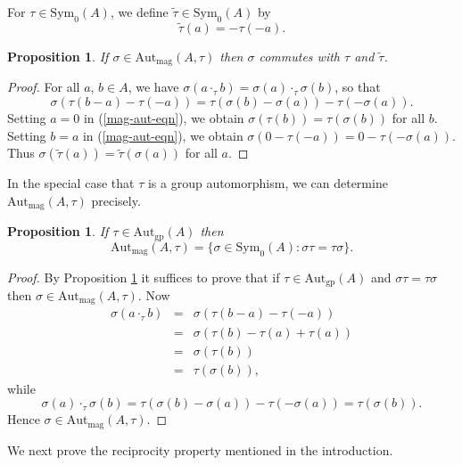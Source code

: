 \documentclass[letterpaper,12pt]{amsart}
\numberwithin{equation}{section}
\numberwithin{algorithm}{section}
\newtheorem{proposition}[lemma]{Proposition}
\theoremstyle{definition}
\newcommand{\Autgp}{\mathrm{Aut}_{\mathrm{gp}}}
\newcommand{\Autmag}{\mathrm{Aut}_\mathrm{mag}}
\newcommand{\Symo}{\mathrm{Sym}_0}
\newcommand{\ttau}{\tilde{\tau}}
\begin{document}
For $\tau \in \Symo(A)$, we define $\ttau \in \Symo(A)$ by
\begin{equation} \label{ttau}
	\ttau(a) = -\tau(-a). 
\end{equation}

\begin{proposition} \label{tilde-comm}
If $\sigma \in \Autmag(A,\tau)$ then $\sigma$ commutes with $\tau$ and $\ttau$.
\end{proposition}
\begin{proof}
For all $a$, $b \in A$, we have 
$\sigma(a \cdot_\tau b) = \sigma(a) \cdot_\tau \sigma(b)$, so that 
\begin{equation} \label{mag-aut-eqn}
	 \sigma( \tau(b-a) - \tau(-a)) = \tau(\sigma(b)-\sigma(a)) - \tau( - \sigma(a)). 
\end{equation} 
Setting $a=0$ in (\ref{mag-aut-eqn}), we obtain $\sigma(\tau(b))=\tau(\sigma(b))$
for all $b$. Setting $b=a$  in (\ref{mag-aut-eqn}), we obtain $\sigma(0-\tau(-a))=0-\tau(-\sigma(a))$. Thus $\sigma(\ttau(a))=\ttau(\sigma(a))$ for all $a$.
\end{proof}

In the special case that $\tau$ is a group automorphism, we can determine $\Autmag(A,\tau)$ precisely.

\begin{proposition} \label{autom}
If $\tau \in \Autgp(A)$ then 
$$ \Autmag(A,\tau) = \{ \sigma \in \Symo(A) : \sigma \tau = \tau \sigma \}. $$
\end{proposition}
\begin{proof}
By Proposition \ref{tilde-comm} it suffices to prove that if  $\tau \in \Autgp(A)$ and $\sigma \tau = \tau \sigma$ then $\sigma \in \Autmag(A,\tau)$. Now 
\begin{eqnarray*}
 \sigma(a \cdot_\tau b) & = & \sigma(\tau(b-a)-\tau(-a)) \\
                    &  = & \sigma(\tau(b)-\tau(a)+\tau(a)) \\
                    & = &  \sigma(\tau(b)) \\
                    & = &	\tau(\sigma(b)), 
\end{eqnarray*}  
while
$$ \sigma(a) \cdot_\tau \sigma(b) = \tau(\sigma(b)-\sigma(a)) -
\tau(-\sigma(a)) = \tau(\sigma(b)). $$
Hence $\sigma \in \Autmag(A,\tau)$. 
\end{proof}
	
We next prove the reciprocity property mentioned in the introduction.
	
\end{document}
